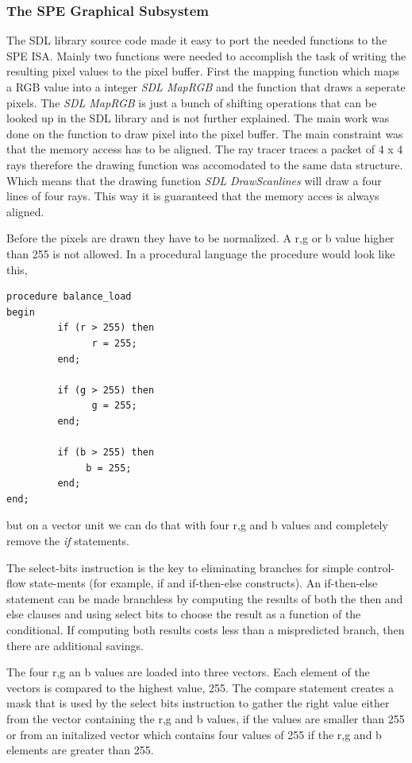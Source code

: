 \documentclass[DIV10, abstracton, openright, footsepline, headsepline, twoside, 9pt,
bigheadings]{scrreprt}
\begin{document}
\subsubsection{The SPE Graphical Subsystem}
\label{sec:impl_spe_graphical_subsystem}

The SDL library source code made it easy to port the needed functions to the SPE
ISA. Mainly two functions were needed to accomplish the task of writing the resulting
pixel values to the pixel buffer. First the mapping function which maps a RGB value
into a integer \textit{SDL MapRGB} and the function that draws a seperate pixels.
The \textit{SDL MapRGB} is  just a bunch of shifting operations that can be looked
up in the SDL library and is not further explained.
The main work was done on the function to draw pixel into the pixel buffer. The main
constraint was that the memory access has to be aligned. The ray tracer traces a packet
of 4 x 4 rays therefore the drawing function was accomodated to the same data structure.
Which means that the drawing function \textit{SDL DrawScanlines} will draw a four lines
of four rays. This way it is guaranteed that the memory acces is always aligned.

Before the pixels are drawn they have to be normalized. A r,g or b value higher than
255 is not allowed. In a procedural language the procedure would look like this,

\begin{lstlisting}[caption=Pseudo code for simple control-flow statments]
procedure balance_load
begin
         if (r > 255) then
               r = 255;
         end;

         if (g > 255) then
               g = 255;
         end;

         if (b > 255) then
              b = 255;
         end;
end;
\end{lstlisting}

but on a vector unit we can do that with four r,g and b values and completely
remove the \textit{if} statements.

The select-bits instruction is the key to eliminating branches for simple control-flow
 state-ments (for example, if and if-then-else constructs). An if-then-else statement can
 be made branchless by computing the results of both the then and else clauses and using
select bits to choose the result as a function of the conditional. If computing both results
costs less than a mispredicted branch, then there are additional savings.

The four r,g an b values are loaded into three vectors. Each element of the vectors
is compared to the highest value, 255. The compare statement creates a mask that is used
by the select bits instruction to gather the right value either from the vector containing
the r,g and b values, if the values are smaller than 255 or from an initalized vector which
contains four values of 255 if the r,g and b elements are greater than 255.
\end{document}
